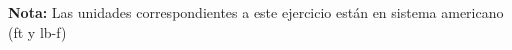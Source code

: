 \documentclass[11pt]{article}
\makeatletter
\newcommand{\boxspacing}{\kern\kvtcb@left@rule\kern\kvtcb@boxsep}
\newcommand{\prompt}[4]{
        {\ttfamily\llap{{\color{#2}[#3]:\hspace{3pt}#4}}\vspace{-\baselineskip}}
    }
\makeatother
\begin{document}
    \textbf{Nota:} Las unidades correspondientes a este ejercicio están en
sistema americano (ft y lb-f)

    \begin{tcolorbox}[breakable, size=fbox, boxrule=1pt, pad at break*=1mm,colback=cellbackground, colframe=cellborder]
\prompt{In}{incolor}{ }{\boxspacing}
\begin{Verbatim}[commandchars=\\\{\}]

\end{Verbatim}
\end{tcolorbox}


    
    
    
\end{document}
